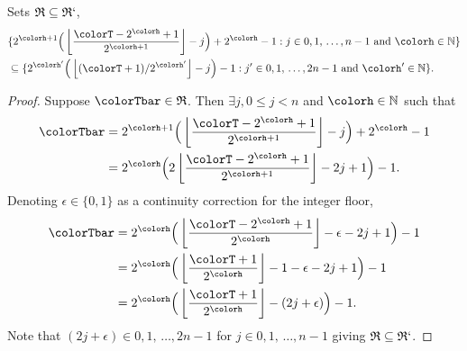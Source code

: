 \begin{sublemma}
\label{thm:tilted-rsubset}
Sets $\mathfrak{R} \subseteq \mathfrak{R}`$,
\begin{align*}
&\{
  2^{\colorh + 1}\Big( \left\lfloor\frac{\colorT - 2^{\colorh} + 1}{2^{\colorh + 1}} \right\rfloor - j\Big) + 2^{\colorh} - 1
  :
  j \in 0,1,\,\ldots,n-1
  \text{ and }
  \colorh \in \mathbb{N}
\}\\
&\subseteq
\{
  2^{\colorh'}\Big(\left\lfloor (\colorT + 1) / 2^{\colorh'} \right\rfloor - j\Big) - 1
  :
  j' \in 0,1,\,\ldots,2n-1
  \text{ and }
  \colorh' \in \mathbb{N}
\}.
\end{align*}
\end{sublemma}
\begin{proof}
Suppose $\colorTbar \in \mathfrak{R}$.
Then $\exists j,  0 \leq j < n$ and $\colorh \in \mathbb{N}$ such that
\begin{align*}
\colorTbar
&= 2^{\colorh + 1}\Big(\left\lfloor \frac{\colorT - 2^{\colorh} + 1}{2^{\colorh + 1}} \right\rfloor - j \Big) + 2^{\colorh} - 1\\
&= 2^{\colorh} \Big(2\left\lfloor \frac{\colorT - 2^{\colorh} + 1}{2^{\colorh + 1}} \right\rfloor  - 2j + 1 \Big) - 1.
\end{align*}
Denoting $\epsilon \in \{0, 1\}$ as a continuity correction for the integer floor,
\begin{align*}
\colorTbar
&= 2^{\colorh} \Big( \left\lfloor \frac{\colorT - 2^{\colorh} + 1}{2^{\colorh}} \right\rfloor - \epsilon  - 2j + 1 \Big) - 1\\
&= 2^{\colorh} \Big( \left\lfloor \frac{\colorT + 1}{2^{\colorh}} \right\rfloor - 1 - \epsilon - 2j + 1 \Big) - 1\\
&= 2^{\colorh} \Big(\left\lfloor \frac{\colorT + 1}{2^{\colorh}}\right\rfloor - (2j + \epsilon) \Big) - 1.
\end{align*}
Note that $(2j + \epsilon) \in 0,1,\,\ldots,2n-1$ for $j \in 0,1,\,\ldots,n-1$ giving $\mathfrak{R} \subseteq \mathfrak{R}`$.
\end{proof}

